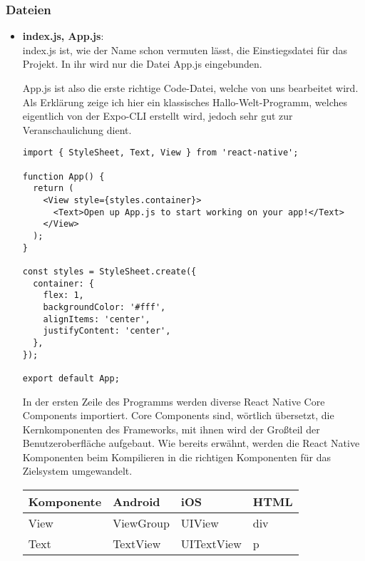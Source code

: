 \newpage
\subsubsection{Dateien}

\begin{itemize}
\item \textbf{index.js, App.js}:\\
index.js ist, wie der Name schon vermuten lässt, die Einstiegsdatei für das Projekt. In ihr wird
nur die Datei App.js eingebunden.

App.js ist also die erste richtige Code-Datei, welche von uns bearbeitet wird. Als Erklärung zeige
ich hier ein klassisches Hallo-Welt-Programm, welches eigentlich von der Expo-CLI erstellt wird,
jedoch sehr gut zur Veranschaulichung dient.

\begin{lstlisting}
import { StyleSheet, Text, View } from 'react-native';

function App() {
  return (
    <View style={styles.container}>
      <Text>Open up App.js to start working on your app!</Text>
    </View>
  );
}

const styles = StyleSheet.create({
  container: {
    flex: 1,
    backgroundColor: '#fff',
    alignItems: 'center',
    justifyContent: 'center',
  },
});

export default App;
\end{lstlisting}

In der ersten Zeile des Programms werden diverse React Native Core Components importiert. Core
Components sind, wörtlich übersetzt, die Kernkomponenten des Frameworks, mit ihnen wird der Großteil
der Benutzeroberfläche aufgebaut. Wie bereits erwähnt, werden die React Native Komponenten beim
Kompilieren in die richtigen Komponenten für das Zielsystem umgewandelt.

\begin{table}[H]
\centering
\begin{tabular}{|l|l|l|l|}
  \hline
  \textbf{Komponente} & \textbf{Android} & \textbf{iOS} & \textbf{HTML} \\ \hline\hline
  View                & ViewGroup        & UIView       & div          \\
  Text                & TextView         & UITextView   & p            \\ \hline
\end{tabular}
\end{table}


\end{itemize}
